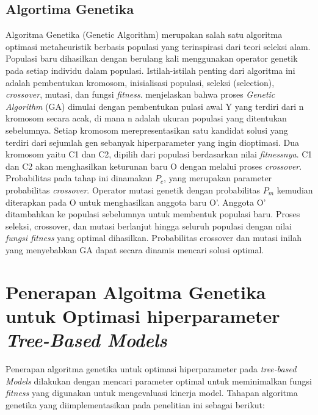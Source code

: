     \subsection{Algortima Genetika}\label{sec:ga}
    
    Algoritma Genetika (Genetic Algorithm) merupakan salah satu algoritma optimasi metaheuristik berbasis populasi yang terinspirasi dari teori seleksi alam. Populasi baru dihasilkan dengan berulang kali menggunakan operator genetik pada setiap individu dalam populasi. Istilah-istilah penting dari algoritma ini adalah pembentukan kromosom, inisialisasi populasi, seleksi (selection), \textit{crossover}, mutasi, dan fungsi \textit{fitness}.  menjelaskan bahwa proses \textit{Genetic Algorithm} (GA) dimulai dengan pembentukan pulasi awal Y yang terdiri dari n kromosom secara acak, di mana n adalah ukuran populasi yang ditentukan sebelumnya. Setiap kromosom merepresentasikan satu kandidat solusi yang terdiri dari sejumlah gen sebanyak hiperparameter yang ingin dioptimasi. Dua kromosom yaitu C1 dan C2, dipilih dari populasi berdasarkan nilai \textit{fitnessnya}. C1 dan C2 akan menghasilkan keturunan baru O dengan melalui proses \textit{crossover}. Probabilitas pada tahap ini dinamakan $P_c$, yang merupakan parameter probabilitas \textit{crossover}. Operator mutasi genetik dengan probabilitas $P_m$ kemudian diterapkan pada O untuk menghasilkan anggota baru O’. Anggota O’ ditambahkan ke populasi sebelumnya untuk membentuk populasi baru. Proses seleksi, crossover, dan mutasi berlanjut hingga seluruh populasi dengan nilai \textit{fungsi fitness} yang optimal dihasilkan. Probabilitas crossover dan mutasi inilah yang menyebabkan GA dapat secara dinamis mencari solusi optimal.


    \section{Penerapan Algoitma Genetika untuk Optimasi hiperparameter \textit{Tree-Based Models}}

    Penerapan algoritma genetika untuk optimasi hiperparameter pada \textit{tree-based Models} dilakukan dengan mencari parameter optimal untuk meminimalkan fungsi \textit{fitness} yang digunakan untuk mengevaluasi kinerja model.  Tahapan algoritma genetika yang diimplementasikan pada penelitian ini sebagai berikut:  
    
